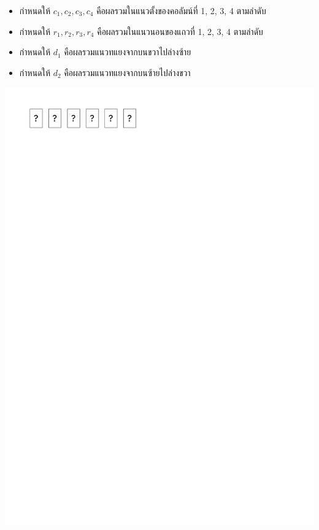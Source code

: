 \begin{minipage}{0.4\linewidth}
    \begin{itemize}[topsep=0pc,itemsep=0pc,leftmargin=0pc]
        \item  กำหนดให้ $c_1, c_2, c_3, c_4$ คือผลรวมในแนวตั้งของคอลัมน์ที่ 1, 2, 3, 4 ตามลำดับ
        \item  กำหนดให้ $r_1, r_2, r_3, r_4$ คือผลรวมในแนวนอนของแถวที่ 1, 2, 3, 4 ตามลำดับ
        \item  กำหนดให้ $d_1$ คือผลรวมแนวทแยงจากบนขวาไปล่างซ้าย 
        \item  กำหนดให้ $d_2$ คือผลรวมแนวทแยงจากบนซ้ายไปล่างขวา
    \end{itemize}
    \vspace*{1pc}
\end{minipage}
\begin{minipage}{0.525\linewidth}
    \begin{center}
        \includegraphics[page=5]{figures/puzzle.pdf}
    \end{center}    
\end{minipage}

